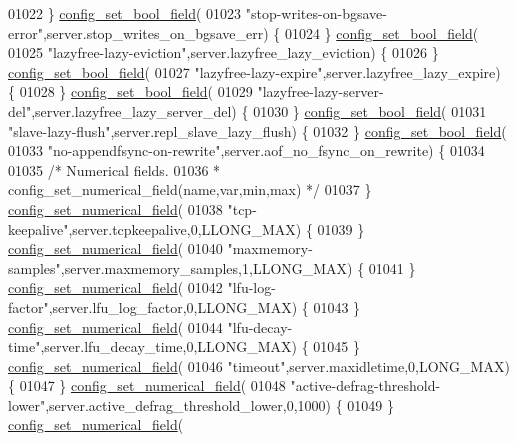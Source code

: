 \begin{DoxyCode}
{{{{{{{{01022     \} \hyperlink{config_8c_a345bb09b35c40e88bc2e2e3c3a1db6b0}{config\_set\_bool\_field}(
01023       \textcolor{stringliteral}{"stop-writes-on-bgsave-error"},server.stop\_writes\_on\_bgsave\_err) \{
01024     \} \hyperlink{config_8c_a345bb09b35c40e88bc2e2e3c3a1db6b0}{config\_set\_bool\_field}(
01025       \textcolor{stringliteral}{"lazyfree-lazy-eviction"},server.lazyfree\_lazy\_eviction) \{
01026     \} \hyperlink{config_8c_a345bb09b35c40e88bc2e2e3c3a1db6b0}{config\_set\_bool\_field}(
01027       \textcolor{stringliteral}{"lazyfree-lazy-expire"},server.lazyfree\_lazy\_expire) \{
01028     \} \hyperlink{config_8c_a345bb09b35c40e88bc2e2e3c3a1db6b0}{config\_set\_bool\_field}(
01029       \textcolor{stringliteral}{"lazyfree-lazy-server-del"},server.lazyfree\_lazy\_server\_del) \{
01030     \} \hyperlink{config_8c_a345bb09b35c40e88bc2e2e3c3a1db6b0}{config\_set\_bool\_field}(
01031       \textcolor{stringliteral}{"slave-lazy-flush"},server.repl\_slave\_lazy\_flush) \{
01032     \} \hyperlink{config_8c_a345bb09b35c40e88bc2e2e3c3a1db6b0}{config\_set\_bool\_field}(
01033       \textcolor{stringliteral}{"no-appendfsync-on-rewrite"},server.aof\_no\_fsync\_on\_rewrite) \{
01034 
01035     \textcolor{comment}{/* Numerical fields.}
01036 \textcolor{comment}{     * config\_set\_numerical\_field(name,var,min,max) */}
01037     \} \hyperlink{config_8c_aba8f21b37a3e47952951cf4bd15ad296}{config\_set\_numerical\_field}(
01038       \textcolor{stringliteral}{"tcp-keepalive"},server.tcpkeepalive,0,LLONG\_MAX) \{
01039     \} \hyperlink{config_8c_aba8f21b37a3e47952951cf4bd15ad296}{config\_set\_numerical\_field}(
01040       \textcolor{stringliteral}{"maxmemory-samples"},server.maxmemory\_samples,1,LLONG\_MAX) \{
01041     \} \hyperlink{config_8c_aba8f21b37a3e47952951cf4bd15ad296}{config\_set\_numerical\_field}(
01042       \textcolor{stringliteral}{"lfu-log-factor"},server.lfu\_log\_factor,0,LLONG\_MAX) \{
01043     \} \hyperlink{config_8c_aba8f21b37a3e47952951cf4bd15ad296}{config\_set\_numerical\_field}(
01044       \textcolor{stringliteral}{"lfu-decay-time"},server.lfu\_decay\_time,0,LLONG\_MAX) \{
01045     \} \hyperlink{config_8c_aba8f21b37a3e47952951cf4bd15ad296}{config\_set\_numerical\_field}(
01046       \textcolor{stringliteral}{"timeout"},server.maxidletime,0,LONG\_MAX) \{
01047     \} \hyperlink{config_8c_aba8f21b37a3e47952951cf4bd15ad296}{config\_set\_numerical\_field}(
01048       \textcolor{stringliteral}{"active-defrag-threshold-lower"},server.active\_defrag\_threshold\_lower,0,1000) \{
01049     \} \hyperlink{config_8c_aba8f21b37a3e47952951cf4bd15ad296}{config\_set\_numerical\_field}(
}}}}}}}}
\end{DoxyCode}
